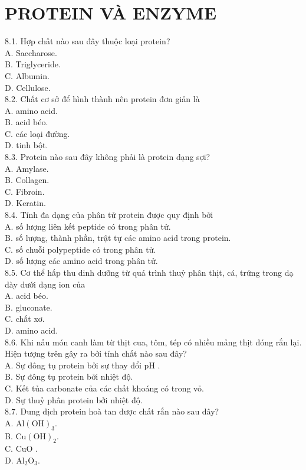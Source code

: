 \documentclass[10pt]{article}
\begin{document}
\section*{PROTEIN VÀ ENZYME}
8.1. Hợp chất nào sau đây thuộc loại protein?\\
A. Saccharose.\\
B. Triglyceride.\\
C. Albumin.\\
D. Cellulose.\\
8.2. Chất cơ sở để hình thành nên protein đơn giản là\\
A. amino acid.\\
B. acid béo.\\
C. các loại đường.\\
D. tinh bột.\\
8.3. Protein nào sau đây không phải là protein dạng sợi?\\
A. Amylase.\\
B. Collagen.\\
C. Fibroin.\\
D. Keratin.\\
8.4. Tính đa dạng của phân tử protein được quy định bởi\\
A. số lượng liên kết peptide có trong phân tử.\\
B. số lượng, thành phần, trật tự các amino acid trong protein.\\
C. số chuỗi polypeptide có trong phân tử.\\
D. số lượng các amino acid trong phân tử.\\
8.5. Cơ thể hấp thu dinh dưỡng từ quá trình thuỷ phân thịt, cá, trứng trong dạ dày dưới dạng ion của\\
A. acid béo.\\
B. gluconate.\\
C. chất xơ.\\
D. amino acid.\\
8.6. Khi nấu món canh làm từ thịt cua, tôm, tép có nhiều mảng thịt đóng rắn lại. Hiện tượng trên gây ra bởi tính chất nào sau đây?\\
A. Sự đông tụ protein bởi sự thay đổi pH .\\
B. Sự đông tụ protein bởi nhiệt độ.\\
C. Kết tủa carbonate của các chất khoáng có trong vỏ.\\
D. Sự thuỷ phân protein bởi nhiệt độ.\\
8.7. Dung dịch protein hoà tan được chất rắn nào sau đây?\\
A. $\mathrm{Al}(\mathrm{OH})_{3}$.\\
B. $\mathrm{Cu}(\mathrm{OH})_{2}$.\\
C. CuO .\\
D. $\mathrm{Al}_{2} \mathrm{O}_{3}$.
\end{document}
